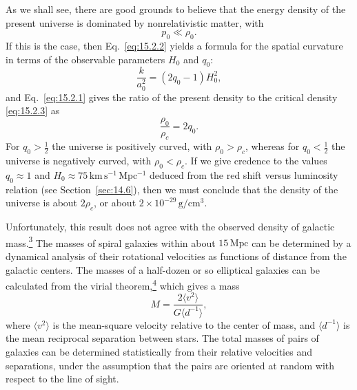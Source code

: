 As we shall see, there are good grounds to believe that the energy density of
the present universe is dominated by nonrelativistic matter, with
\begin{equation}
  p_0\ll\rho_0.
  \tag{15.2.4}\label{eq:15.2.4}
\end{equation}
If this is the case, then Eq.~\eqref{eq:15.2.2} yields a formula for the
spatial curvature in terms of the observable parameters \(H_0\) and \(q_0\):
\begin{equation}
  \frac{k}{a_0^2}=(2q_0-1)H_0^2,
  \tag{15.2.5}\label{eq:15.2.5}
\end{equation}
and Eq.~\eqref{eq:15.2.1} gives the ratio of the present density to the
critical density \eqref{eq:15.2.3} as
\begin{equation}
  \frac{\rho_0}{\rho_c}=2q_0.
  \tag{15.2.6}\label{eq:15.2.6}
\end{equation}
For \(q_0>\tfrac12\) the universe is positively curved, with
\(\rho_0>\rho_c\), whereas for \(q_0<\tfrac12\) the universe is negatively
curved, with \(\rho_0<\rho_c\). If we give credence to the values
\(q_0\approx1\) and
\(H_0\approx75\,\mathrm{km\,s^{-1}\,Mpc^{-1}}\) deduced from the red shift
versus luminosity relation (see Section~\ref{sec:14.6}), then we must conclude
that the density of the universe is about \(2\rho_c\), or about
\(2\times10^{-29}\,\mathrm{g/cm^3}\).

Unfortunately, this result does not agree with the observed density of galactic
mass.\hyperref[ch15-ref-3]{\textsuperscript{3}} The masses of spiral galaxies
within about \(15\,\mathrm{Mpc}\) can be determined by a dynamical analysis of
their rotational velocities as functions of distance from the galactic centers.
The masses of a half-dozen or so elliptical galaxies can be calculated from the
virial theorem,\hyperref[ch15-ref-4]{\textsuperscript{4}} which gives a mass
\begin{equation}
  M=\frac{2\langle v^2\rangle}{G\langle d^{-1}\rangle},
  \tag{15.2.7}\label{eq:15.2.7}
\end{equation}
where \(\langle v^2\rangle\) is the mean-square velocity relative to the
center of mass, and \(\langle d^{-1}\rangle\) is the mean reciprocal
separation between stars. The total masses of pairs of galaxies can be
determined statistically from their relative velocities and separations, under
the assumption that the pairs are oriented at random with respect to the line
of sight.

